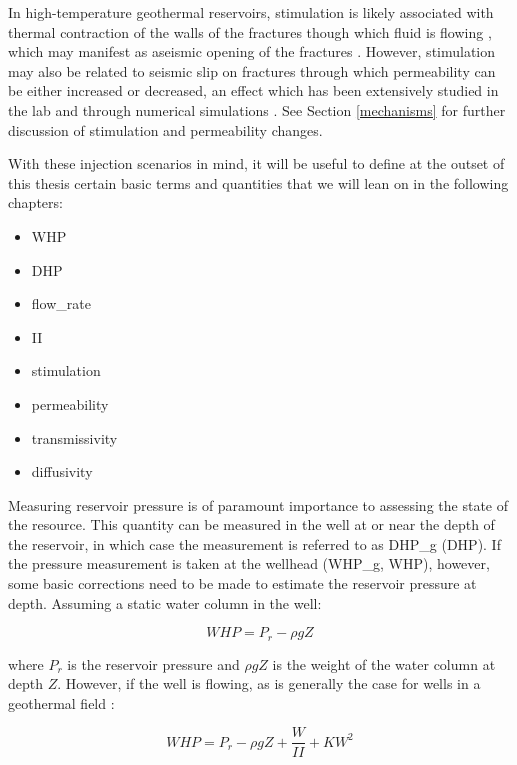 \begin{itemize}
  In high-temperature geothermal reservoirs, stimulation is likely associated with thermal contraction of the walls of the fractures though which fluid is flowing \citep{grant2013thermal}, which may manifest as aseismic opening of the fractures \citep[e.g.][]{Guglielmi_2015}. However, stimulation may also be related to seismic slip on fractures through which \gls{permeability} can be either increased or decreased, an effect which has been extensively studied in the lab and through numerical simulations \citep[e.g.][and references therein]{Lee_2002,Fang_2017}. See Section \ref{mechanisms} for further discussion of stimulation and \gls{permeability} changes.
\end{itemize}

With these injection scenarios in mind, it will be useful to define at the outset of this thesis certain basic terms and quantities that we will lean on in the following chapters:
\begin{itemize}
  \item{\acrfull{WHP}}
  \item{\acrfull{DHP}}
  \item{\Gls{flow_rate}}
  \item{\acrfull{II}}
  \item{\Gls{stimulation}}
  \item{\Gls{permeability}}
  \item{\Gls{transmissivity}}
  \item{\Gls{diffusivity}}
\end{itemize}

Measuring reservoir pressure is of paramount importance to assessing the state of the resource. This quantity can be measured in the well at or near the depth of the reservoir, in which case the measurement is referred to as \gls{DHP_g} (\acrshort{DHP}). If the pressure measurement is taken at the wellhead (\gls{WHP_g}, \acrshort{WHP}), however, some basic corrections need to be made to estimate the reservoir pressure at depth. Assuming a static water column in the well:

\begin{equation}
WHP = P_{r} - \rho{g}Z
\end{equation}

where $P_{r}$ is the reservoir pressure and $\rho{g}Z$ is the weight of the water column at depth $Z$. However, if the well is flowing, as is generally the case for wells in a geothermal field \citep{grant2013thermal,Clearwater_2015}:

\begin{equation}
WHP = P_{r} - \rho{g}Z + \frac{W}{II} + KW^{2}
\end{equation}

